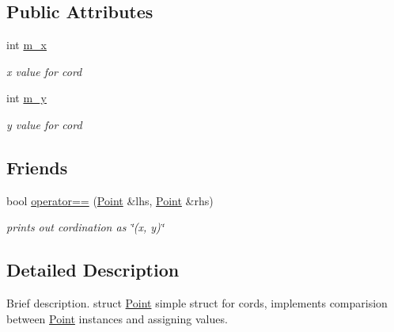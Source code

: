\subsection*{Public Attributes}
\begin{DoxyCompactItemize}
\item 
\hypertarget{struct_point_a885daee8c5064cd51f6a4c3888091fc9}{int \hyperlink{struct_point_a885daee8c5064cd51f6a4c3888091fc9}{m\-\_\-x}}\label{struct_point_a885daee8c5064cd51f6a4c3888091fc9}

\begin{DoxyCompactList}\small\item\em x value for cord \end{DoxyCompactList}\item 
\hypertarget{struct_point_a00e243381d01e186dc2fcc5d24b4d3be}{int \hyperlink{struct_point_a00e243381d01e186dc2fcc5d24b4d3be}{m\-\_\-y}}\label{struct_point_a00e243381d01e186dc2fcc5d24b4d3be}

\begin{DoxyCompactList}\small\item\em y value for cord \end{DoxyCompactList}\end{DoxyCompactItemize}
\subsection*{Friends}
\begin{DoxyCompactItemize}
\item 
\hypertarget{struct_point_a75de5fa7971bc4ffdd3c5d06d776495c}{bool \hyperlink{struct_point_a75de5fa7971bc4ffdd3c5d06d776495c}{operator==} (\hyperlink{struct_point}{Point} \&lhs, \hyperlink{struct_point}{Point} \&rhs)}\label{struct_point_a75de5fa7971bc4ffdd3c5d06d776495c}

\begin{DoxyCompactList}\small\item\em prints out cordination as \char`\"{}(x, y)\char`\"{} \end{DoxyCompactList}\end{DoxyCompactItemize}


\subsection{Detailed Description}
Brief description. struct \hyperlink{struct_point}{Point} simple struct for cords, implements comparision between \hyperlink{struct_point}{Point} instances and assigning values. 

